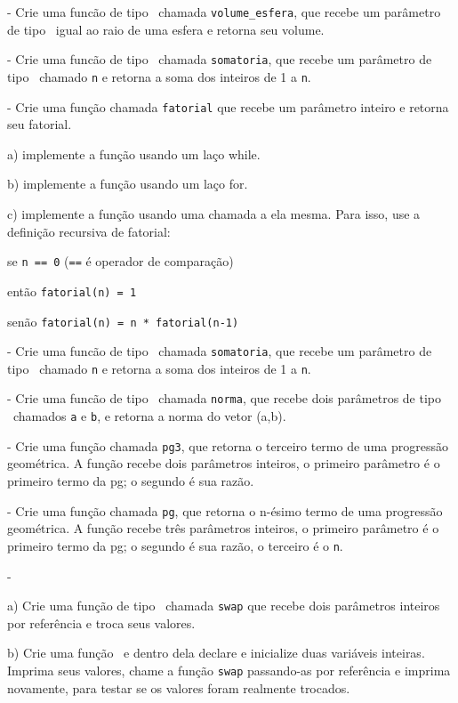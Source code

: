 \NEWLINE
\quest - Crie uma funcão de tipo \FLOAT\ chamada \verb|volume_esfera|, que recebe um parâmetro de tipo \FLOAT\ igual ao raio de uma esfera e retorna seu volume.

\NEWLINE
\quest - Crie uma funcão de tipo \INT\ chamada \verb|somatoria|, que recebe um parâmetro de tipo \INT\ chamado {\tt n} e retorna a soma dos inteiros de 1 a {\tt n}.

\NEWLINE
\quest - Crie uma função chamada {\tt fatorial} que recebe um parâmetro inteiro e retorna seu fatorial.

	a) implemente a função usando um laço while.

	b) implemente a função usando um laço for.

	c) implemente a função usando uma chamada a ela mesma. Para isso, use a definição recursiva de fatorial:

		se {\tt n == 0} ({\tt ==} é operador de comparação) 

então {\tt fatorial(n) = 1}

		senão {\tt fatorial(n) = n * fatorial(n-1)}

\NEWLINE
\quest - Crie uma funcão de tipo \INT\ chamada {\tt somatoria}, que recebe um parâmetro de tipo \INT\ chamado {\tt n} e retorna a soma dos inteiros de 1 a {\tt n}.


\NEWLINE
\quest - Crie uma funcão de tipo \DOUBLE\ chamada {\tt norma}, que recebe dois parâmetros de tipo \DOUBLE\ chamados {\tt a} e {\tt b}, e retorna a norma do vetor (a,b).


\NEWLINE
\quest - Crie uma função chamada {\tt pg3}, que retorna o terceiro termo de uma progressão geométrica. A função recebe dois parâmetros inteiros, o primeiro parâmetro é o primeiro termo da pg; o segundo é sua razão.

\NEWLINE
\quest - Crie uma função chamada {\tt pg}, que retorna o n-ésimo termo de uma progressão geométrica. A função recebe três parâmetros inteiros, o primeiro parâmetro é o primeiro termo da pg; o segundo é sua razão, o terceiro é o {\tt n}.

\NEWLINE
\quest -

a) Crie uma função de tipo \VOID\ chamada {\tt swap} que recebe dois parâmetros inteiros por referência e troca seus valores.

b) Crie uma função  \MAIN\ e dentro dela declare e inicialize duas variáveis inteiras. Imprima seus valores, chame a função {\tt swap} passando-as por referência e imprima novamente, para testar se os valores foram realmente trocados.

